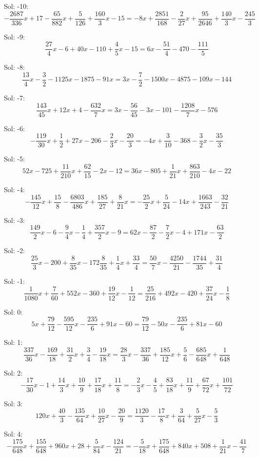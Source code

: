 Sol: -10:\[-\frac{2687}{336}x + 17-\frac{65}{882}x + \frac{5}{126}+\frac{160}{3}x - 15=-8x + \frac{2851}{168}-\frac{2}{27}x + \frac{95}{2646}+\frac{140}{3}x - \frac{245}{3}\]


Sol: -9:\[\frac{27}{4}x - 6+40x - 110+\frac{4}{5}x - 15=6x - \frac{51}{4}-470-\frac{111}{5}\]


Sol: -8:\[\frac{13}{4}x - \frac{3}{2}-1125x - 1875-91x=3x - \frac{7}{2}-1500x - 4875-109x - 144\]


Sol: -7:\[\frac{143}{45}x+12x + 4-\frac{632}{7}x=3x - \frac{56}{45}-3x - 101-\frac{1208}{7}x - 576\]


Sol: -6:\[-\frac{119}{30}x + \frac{1}{2}+27x - 206-\frac{2}{3}x - \frac{20}{3}=-4x + \frac{3}{10}-368-\frac{3}{2}x - \frac{35}{3}\]


Sol: -5:\[52x - 725+\frac{11}{210}x + \frac{62}{15}-2x - 12=36x - 805+\frac{1}{21}x + \frac{863}{210}-4x - 22\]


Sol: -4:\[-\frac{145}{12}x + \frac{15}{8}-\frac{6803}{486}x + \frac{185}{27}+\frac{8}{21}x=-\frac{25}{2}x + \frac{5}{24}-14x + \frac{1663}{243}-\frac{32}{21}\]


Sol: -3:\[\frac{149}{2}x - 6-\frac{9}{4}x - \frac{1}{4}+\frac{357}{2}x - 9=62x - \frac{87}{2}-\frac{7}{2}x - 4+171x - \frac{63}{2}\]


Sol: -2:\[\frac{25}{3}x - 200+\frac{8}{35}x - 172\frac{8}{35}+\frac{1}{4}x + \frac{33}{4}=\frac{50}{7}x - \frac{4250}{21}-\frac{1744}{35}+\frac{31}{4}\]


Sol: -1:\[\frac{1}{1080}x + \frac{7}{60}+552x - 360+\frac{19}{12}x - \frac{1}{12}=\frac{25}{216}+492x - 420+\frac{37}{24}x - \frac{1}{8}\]


Sol: 0:\[5x + \frac{79}{12}-\frac{595}{12}x - \frac{235}{6}+91x - 60=\frac{79}{12}-50x - \frac{235}{6}+81x - 60\]


Sol: 1:\[\frac{337}{36}x - \frac{169}{18}+\frac{31}{2}x + \frac{3}{4}-\frac{19}{18}x=\frac{28}{3}x - \frac{337}{36}+\frac{185}{12}x + \frac{5}{6}-\frac{685}{648}x + \frac{1}{648}\]


Sol: 2:\[-\frac{17}{30}x - 1+\frac{14}{3}x + \frac{10}{9}+\frac{17}{18}x + \frac{11}{8}=-\frac{2}{3}x - \frac{4}{5}+\frac{83}{18}x + \frac{11}{9}+\frac{67}{72}x + \frac{101}{72}\]


Sol: 3:\[120x + \frac{40}{3}-\frac{135}{64}x+\frac{10}{27}x - \frac{20}{9}=\frac{1120}{3}-\frac{17}{8}x + \frac{3}{64}+\frac{5}{27}x - \frac{5}{3}\]


Sol: 4:\[-\frac{175}{648}x + \frac{155}{648}+960x + 28+\frac{5}{84}x - \frac{124}{21}=-\frac{5}{18}x + \frac{175}{648}+840x + 508+\frac{1}{21}x - \frac{41}{7}\]


